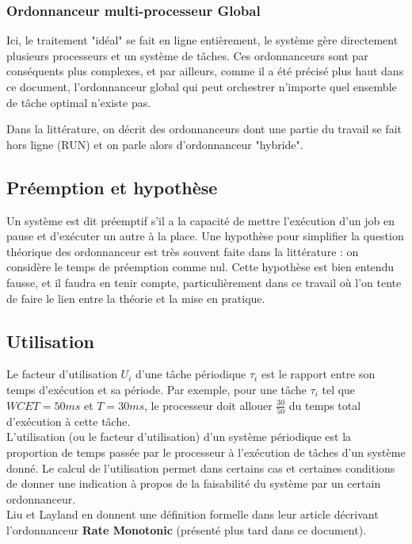 \documentclass[11pt,a4paper,oneside]{report}
\begin{document}
\subsubsection{Ordonnanceur multi-processeur Global}
Ici, le traitement "idéal" se fait en ligne entièrement, le système gère directement 
plusieurs processeurs et un système de tâches. Ces ordonnanceurs sont par 
conséquents plus complexes, et par ailleurs, comme il a été précisé plus haut dans 
ce document, l'ordonnanceur global qui peut orchestrer n'importe quel ensemble de 
tâche optimal n'existe pas.

Dans la littérature, on décrit des ordonnanceurs dont une partie du travail se fait 
hors ligne (RUN) %
et on parle alors d'ordonnanceur "hybride".
	
\subsection{Préemption et hypothèse} 
Un système est dit préemptif s'il a la capacité 
	de mettre l'exécution d'un job en pause et d'exécuter un autre à la place. 
	Une hypothèse pour simplifier la question théorique des ordonnanceur est 
	très souvent faite dans la littérature : on considère le temps de 
	préemption comme nul. Cette hypothèse est bien entendu fausse, et il faudra 
	en tenir compte, particulièrement dans ce travail où l'on tente de faire 
	le lien entre la théorie et la mise en pratique. 

\subsection{Utilisation}
Le facteur d'utilisation $U_i$ d'une tâche périodique $\tau_i$ est le rapport entre 
son temps d'exécution et sa période. Par exemple, pour une tâche $\tau_i$ tel que 
$WCET = 50 ms$ et $T = 30 ms$, le processeur doit allouer $\frac{30}{50}$ du temps 
total d'exécution à cette tâche.\\

L'utilisation (ou le facteur d'utilisation) d'un système périodique est la proportion de temps 
passée par le processeur à l'exécution de tâches d'un système donné. 
Le calcul de l'utilisation permet dans certains cas et certaines conditions de donner une indication 
à propos de la faisabilité du système par un certain ordonnanceur. 
\\

Liu et Layland \cite{liu_scheduling_1973} en donnent une définition formelle dans leur article décrivant l'ordonnanceur \textbf{Rate Monotonic} (présenté plus tard dans ce document).\\ 
\end{document}
